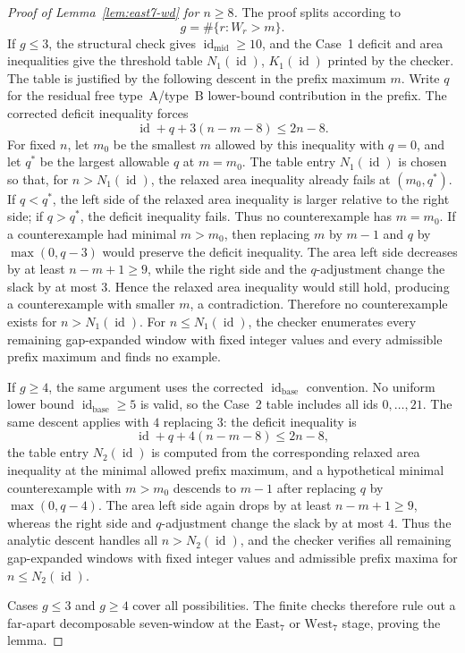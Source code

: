 \documentclass[11pt]{article}
\theoremstyle{plain}
\theoremstyle{definition}
\theoremstyle{remark}
\begin{document}
\begin{proof}[Proof of Lemma~\ref{lem:east7-wd} for \(n\ge 8\)]
The proof splits according to
\[
  g=\#\{r: W_r>m\}.
\]
If \(g\le3\), the structural check gives
\(\operatorname{id}_{\mathrm{mid}}\ge10\), and the Case~1 deficit and area inequalities give
the threshold table \(N_1(\operatorname{id})\), \(K_1(\operatorname{id})\)
printed by the checker.  The table is justified by the following descent in
the prefix maximum \(m\).  Write \(q\) for the residual free type~A/type~B
lower-bound contribution in the prefix.  The corrected deficit inequality
forces
\[
  \operatorname{id}+q+3(n-m-8)\le 2n-8.
\]
For fixed \(n\), let \(m_0\) be the smallest \(m\) allowed by this inequality
with \(q=0\), and let \(q^*\) be the largest allowable \(q\) at \(m=m_0\).
The table entry \(N_1(\operatorname{id})\) is chosen so that, for
\(n>N_1(\operatorname{id})\), the relaxed area inequality already fails at
\((m_0,q^*)\).  If \(q<q^*\), the left side of the relaxed area inequality is
larger relative to the right side; if \(q>q^*\), the deficit inequality fails.
Thus no counterexample has \(m=m_0\).  If a counterexample had minimal
\(m>m_0\), then replacing \(m\) by \(m-1\) and \(q\) by \(\max(0,q-3)\) would
preserve the deficit inequality.  The area left side decreases by at least
\(n-m+1\ge9\), while the right side and the \(q\)-adjustment change the slack by
at most \(3\).  Hence the relaxed area inequality would still hold, producing a
counterexample with smaller \(m\), a contradiction.  Therefore no
counterexample exists for \(n>N_1(\operatorname{id})\).  For
\(n\le N_1(\operatorname{id})\), the checker enumerates every remaining
gap-expanded window with fixed integer values and every admissible prefix
maximum and finds no example.

If \(g\ge4\), the same argument uses the corrected
\(\operatorname{id}_{\mathrm{base}}\) convention.  No uniform
lower bound \(\operatorname{id}_{\mathrm{base}}\ge5\) is valid, so the Case~2 table includes
all ids \(0,\ldots,21\).  The same descent applies with \(4\) replacing \(3\):
the deficit inequality is
\[
  \operatorname{id}+q+4(n-m-8)\le 2n-8,
\]
the table entry \(N_2(\operatorname{id})\) is computed from the corresponding
relaxed area inequality at the minimal allowed prefix maximum, and a hypothetical
minimal counterexample with \(m>m_0\) descends to \(m-1\) after replacing \(q\)
by \(\max(0,q-4)\).  The area left side again drops by at least \(n-m+1\ge9\),
whereas the right side and \(q\)-adjustment change the slack by at most \(4\).
Thus the analytic descent handles all \(n>N_2(\operatorname{id})\), and the
checker verifies all remaining gap-expanded windows with fixed integer values
and admissible prefix maxima for \(n\le N_2(\operatorname{id})\).

Cases \(g\le3\) and \(g\ge4\) cover all possibilities.  The finite
checks therefore rule out a far-apart decomposable seven-window at the
\(\mathrm{East}_7\) or \(\mathrm{West}_7\) stage, proving the lemma.
\end{proof}
\end{document}
